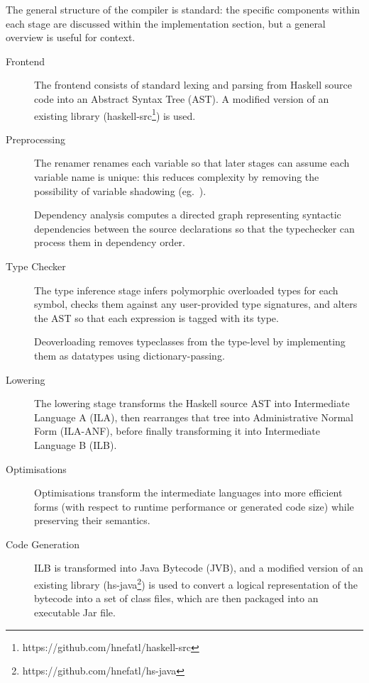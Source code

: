 \documentclass[dissertation.tex]{subfiles}
\begin{document}
{
    The general structure of the compiler is standard: the specific components within each stage are discussed within the implementation section, but a general overview is useful for context.

    \begin{description}
    \item[Frontend]
    {
        \hfill

        The frontend consists of standard lexing and parsing from Haskell source code into an Abstract Syntax Tree (AST). A modified version of an existing library (haskell-src\footnote{https://github.com/hnefatl/haskell-src}) is used.

    }
    \item[Preprocessing]
    {
        \hfill

        The renamer renames each variable so that later stages can assume each variable name is unique: this reduces complexity by removing the possibility of variable shadowing (eg.\ ). 

        Dependency analysis computes a directed graph representing syntactic dependencies between the source declarations so that the typechecker can process them in dependency order.
    }
    \item[Type Checker]
    {
        \hfill

        The type inference stage infers polymorphic overloaded types for each symbol, checks them against any user-provided type signatures, and alters the AST so that each expression is tagged with its type.

        Deoverloading removes typeclasses from the type-level by implementing them as datatypes using dictionary-passing.
    }
    \item[Lowering]
    {
        \hfill

        The lowering stage transforms the Haskell source AST into Intermediate Language A (ILA), then rearranges that tree into Administrative Normal Form (ILA-ANF), before finally transforming it into Intermediate Language B (ILB).
    }
    \item[Optimisations]
    {
        \hfill

        Optimisations transform the intermediate languages into more efficient forms (with respect to runtime performance or generated code size) while preserving their semantics.
    }
    \item[Code Generation]
    {
        \hfill

        ILB is transformed into Java Bytecode (JVB), and a modified version of an existing library (hs-java\footnote{https://github.com/hnefatl/hs-java}) is used to convert a logical representation of the bytecode into a set of class files, which are then packaged into an executable Jar file.
    }
    \end{description}
}
\end{document}
